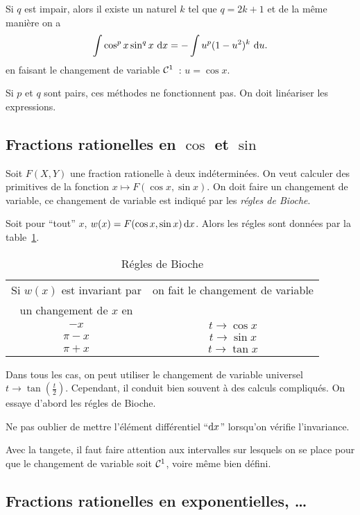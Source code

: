 Si \(q\) est impair, alors il existe un naturel \(k\) tel que \(q=2k+1\) et de la même manière on a
\begin{equation}
  \int \cos^p x \sin^q x\,\mathop{}\mathopen{}\mathrm{d} x = -\int u^p(1-u^2)^k \,\mathop{}\mathopen{}\mathrm{d} u.
\end{equation}
en faisant le changement de variable \(\mathcal{C}^{1}\)~: \(u=\cos x\).

Si \(p\) et \(q\) sont pairs, ces méthodes ne fonctionnent pas. On doit linéariser les expressions.

\subsection{Fractions rationelles en \(\cos\) et \(\sin\)}

Soit \(F(X,Y)\) une fraction rationelle à deux indéterminées. On veut calculer des primitives de la fonction \(x \longmapsto F(\cos x,\sin x)\). On doit faire un changement de variable, ce changement de variable est indiqué par les \emph{régles de Bioche}.

Soit pour ``tout'' \(x\), \(w(x)=F(\cos x,\sin x)\mathop{}\mathopen{}\mathrm{d} x\). Alors les régles sont données par la table~\ref{tab:bioche}.
\begin{table}[!h]
  \centering
  \begin{tabular}{|c|c|}\hline
    Si \(w(x)\) est invariant par & on fait le changement de variable \\
    un changement de \(x\) en &  \\ \hline
    \(-x\) & \(t \to \cos x\)\\
    \(\pi-x\) & \(t \to \sin x\)\\
    \(\pi+x\) & \(t \to \tan x\)\\
  \hline\end{tabular}
  \caption{Régles de Bioche}
  \label{tab:bioche}
\end{table}

Dans tous les cas, on peut utiliser le changement de variable universel \(t \to \tan\left(\frac{t}{2}\right)\). Cependant, il conduit bien souvent à des calculs compliqués. On essaye d'abord les régles de Bioche.

\danger Ne pas oublier de mettre l'élément différentiel ``\(\mathop{}\mathopen{}\mathrm{d} x\)'' lorsqu'on vérifie l'invariance.

\danger Avec la tangete, il faut faire attention aux intervalles sur lesquels on se place pour que le changement de variable soit \(\mathcal{C}^{1}\), voire même bien défini.

\subsection{Fractions rationelles en exponentielles, \ldots}

